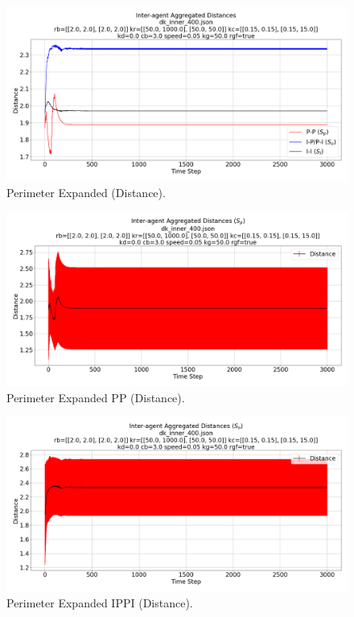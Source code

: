 \documentclass[12pt,a4paper]{IEEEtran}
\begin{document}
\begin{figure}[H]
	\begin{center}
		\includegraphics[width=1.0\linewidth]{figures/innerDistance}
	\end{center}
	\caption{Perimeter Expanded (Distance). \label{fig:perimExpandDistance}}
\end{figure}

\begin{figure}[H]
	\begin{center}
		\includegraphics[width=1.0\linewidth]{figures/innerDistancePP}
	\end{center}
	\caption{Perimeter Expanded PP (Distance). \label{fig:perimExpandDistancePP}}
\end{figure}

\begin{figure}[H]
	\begin{center}
		\includegraphics[width=1.0\linewidth]{figures/innerDistanceIPPI}
	\end{center}
	\caption{Perimeter Expanded IPPI (Distance). \label{fig:perimExpandDistanceIPPI}}
\end{figure}
\end{document}
